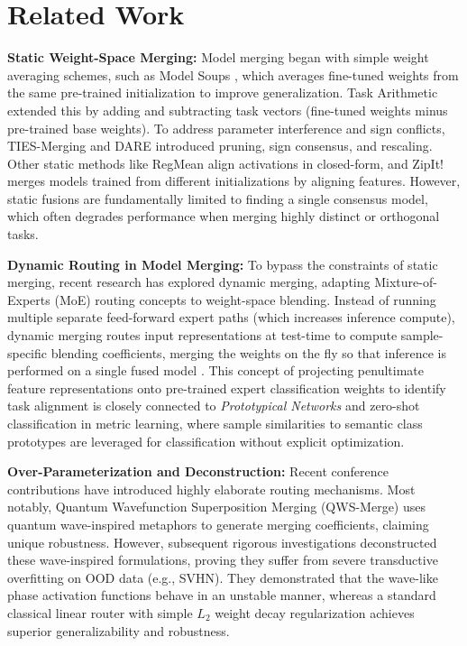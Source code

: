 \section{Related Work}
\label{sec:related_work}

\textbf{Static Weight-Space Merging:} Model merging began with simple weight averaging schemes, such as Model Soups \cite{Wortsman2022}, which averages fine-tuned weights from the same pre-trained initialization to improve generalization. Task Arithmetic \cite{Ilharco2022} extended this by adding and subtracting task vectors (fine-tuned weights minus pre-trained base weights). To address parameter interference and sign conflicts, TIES-Merging \cite{Yadav2023} and DARE \cite{Yu2023} introduced pruning, sign consensus, and rescaling. Other static methods like RegMean \cite{Jin2022} align activations in closed-form, and ZipIt! \cite{Stoica2023} merges models trained from different initializations by aligning features. However, static fusions are fundamentally limited to finding a single consensus model, which often degrades performance when merging highly distinct or orthogonal tasks.

\textbf{Dynamic Routing in Model Merging:} To bypass the constraints of static merging, recent research has explored dynamic merging, adapting Mixture-of-Experts (MoE) routing concepts \cite{Shazeer2017, Fedus2021, Riquelme2021} to weight-space blending. Instead of running multiple separate feed-forward expert paths (which increases inference compute), dynamic merging routes input representations at test-time to compute sample-specific blending coefficients, merging the weights on the fly so that inference is performed on a single fused model \cite{PredecessorT4S6}. This concept of projecting penultimate feature representations onto pre-trained expert classification weights to identify task alignment is closely connected to \emph{Prototypical Networks} \cite{Snell2017} and zero-shot classification in metric learning, where sample similarities to semantic class prototypes are leveraged for classification without explicit optimization. 

\textbf{Over-Parameterization and Deconstruction:} Recent conference contributions have introduced highly elaborate routing mechanisms. Most notably, Quantum Wavefunction Superposition Merging (QWS-Merge) \cite{PredecessorT4S10} uses quantum wave-inspired metaphors to generate merging coefficients, claiming unique robustness. However, subsequent rigorous investigations \cite{PredecessorT5S4, PredecessorT5S5} deconstructed these wave-inspired formulations, proving they suffer from severe transductive overfitting \cite{PredecessorT2S1} on OOD data (e.g., SVHN). They demonstrated that the wave-like phase activation functions behave in an unstable manner, whereas a standard classical linear router with simple $L_2$ weight decay regularization achieves superior generalizability and robustness. 

